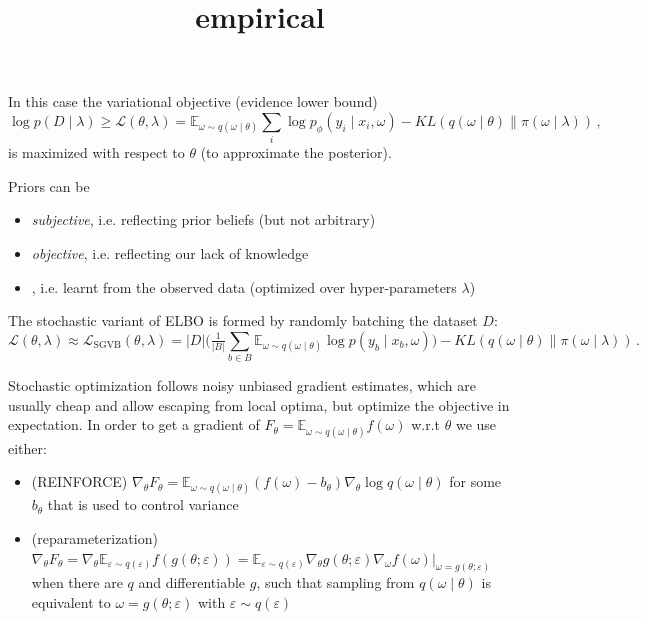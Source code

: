 \documentclass[a4paper,10pt]{article}
\begin{document}
In this case the variational objective (evidence lower bound)
$$
\log p(D\mid \lambda )
  \geq \mathcal{L}(\theta, \lambda)
    = \mathbb{E}_{\omega \sim q(\omega \mid \theta)}
      \sum_i \log p_\phi(y_i \mid x_i, \omega)
    - KL(q(\omega \mid \theta) \| \pi(\omega \mid \lambda))
  \,, $$
is maximized with respect to $\theta$ (to approximate the posterior).

Priors can be
\begin{itemize}
  \item \textit{subjective}, i.e. reflecting prior beliefs (but not arbitrary)
  \item \textit{objective}, i.e. reflecting our lack of knowledge
  \item \title{empirical}, i.e. learnt from the observed data (optimized over
  hyper-parameters $\lambda$)
\end{itemize}

The stochastic variant of ELBO is formed by randomly batching
the dataset $D$:
$$
\mathcal{L}(\theta, \lambda)
  \approx \mathcal{L}_\mathrm{SGVB}(\theta, \lambda)
  = \lvert D \rvert \biggl(
    \tfrac1{\lvert B \rvert}
      \sum_{b \in B} \mathbb{E}_{\omega \sim q(\omega \mid \theta)}
        \log p(y_b \mid x_b, \omega)
  \biggr)
  - KL(q(\omega \mid \theta) \| \pi(\omega \mid \lambda))
  \,. $$

Stochastic optimization follows noisy unbiased gradient estimates, which are usually cheap and
allow escaping from local optima, but optimize the objective in expectation. In order to get
a gradient of $
  F_\theta = \mathbb{E}_{\omega \sim q(\omega \mid \theta)} f(\omega)
$ w.r.t $\theta$ we use either:
\begin{itemize}
  \item (REINFORCE) $
    \nabla_\theta F_\theta
      = \mathbb{E}_{\omega \sim q(\omega \mid \theta)}
        (f(\omega) - b_\theta) \nabla_\theta \log q(\omega \mid \theta)
  $ for some $b_\theta$ that is used to control variance

  \item (reparameterization) $
    \nabla_\theta F_\theta
      = \nabla_\theta \mathbb{E}_{\varepsilon \sim q(\varepsilon)}
        f(g(\theta; \varepsilon))
      = \mathbb{E}_{\varepsilon \sim q(\varepsilon)}
        \nabla_\theta g(\theta; \varepsilon)
          \nabla_\omega f(\omega) \big\vert_{\omega = g(\theta; \varepsilon)}
    $ when there are $q$ and differentiable $g$, such that sampling from $
      q(\omega \mid \theta)
    $ is equivalent to $
      \omega = g(\theta; \varepsilon)
    $ with $\varepsilon \sim q(\varepsilon)$
\end{itemize}
\end{document}
